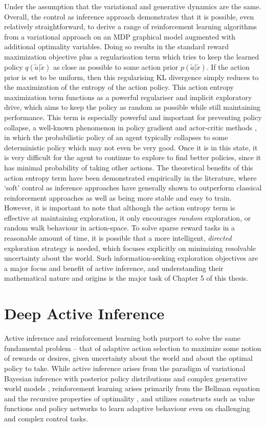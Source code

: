 Under the assumption that the variational and generative dynamics are the same. Overall, the control as inference approach demonstrates that it is possible, even relatively straightforward, to derive a range of reinforcement learning algorithms from a variational approach on an MDP graphical model augmented with additional optimality variables. Doing so results in the standard reward maximization objective plus a regularisation term which tries to keep the learned policy $q(\tilde{a} | \tilde{x})$ as close as possible to some action prior $p(\tilde{a} | \tilde{x})$. If the action prior is set to be uniform, then this regularising KL divergence simply reduces to the maximization of the entropy of the action policy. This action entropy maximization term functions as a powerful regulariser and implicit exploratory drive, which aims to keep the policy as random as possible while still maintaining performance. This term is especially powerful and important for preventing policy collapse, a well-known phenomenon in policy gradient and actor-critic methods \citep{fujimoto2018addressing}, in which the probabilistic policy of an agent typically collapses to some deterministic policy which may not even be very good. Once it is in this state, it is very difficult for the agent to continue to explore to find better policies, since it has minimal probability of taking other actions. The theoretical benefits of this action entropy term have been demonstrated empirically in the literature, where `soft' control as inference approaches have generally shown to outperform classical reinforcement approaches as well as being more stable and easy to train. However, it is important to note that although the action entropy term is effective at maintaining exploration, it only encourages \emph{random} exploration, or random walk behaviour in action-space. To solve sparse reward tasks in a reasonable amount of time, it is possible that a more intelligent, \emph{directed} exploration strategy is needed, which focuses explicitly on minimizing resolvable uncertainty about the world. Such information-seeking exploration objectives are a major focus and benefit of active inference, and understanding their mathematical nature and origins is the major task of Chapter 5 of this thesis.

\section{Deep Active Inference}

Active inference and reinforcement learning both purport to solve the same fundamental problem -- that of adaptive action selection to maximize some notion of rewards or desires, given uncertainty about the world and about the optimal policy to take. While active inference arises from the paradigm of variational Bayesian inference with posterior policy distributions and complex generative world models \citep{friston_active_2015,friston2017process}, reinforcement learning arises primarily from the Bellman equation and the recursive properties of optimality \citep{sutton2018reinforcement,kaelbling1996reinforcement}, and utilizes constructs such as value functions and policy networks to learn adaptive behaviour even on challenging and complex control tasks.

